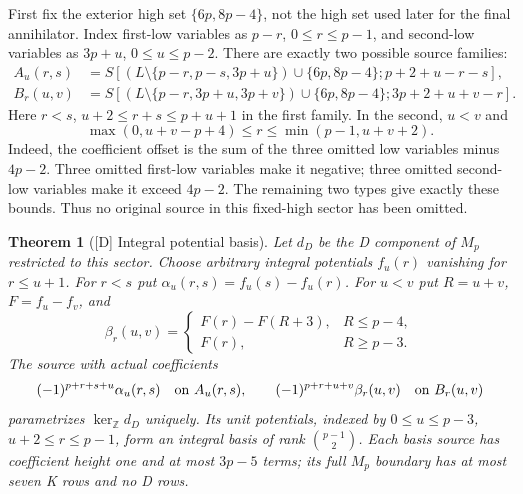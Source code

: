 \documentclass[11pt]{article}
\newtheorem{theorem}{Theorem}[section]
\theoremstyle{definition}
\theoremstyle{remark}
\newcommand{\Z}{\mathbb Z}
\begin{document}
First fix the exterior high set $\{6p,8p-4\}$, not the high set used
later for the final annihilator. Index first-low variables as $p-r$,
$0\leq r\leq p-1$, and second-low variables as $3p+u$,
$0\leq u\leq p-2$. There are exactly two possible source families:
\begin{align*}
 A_u(r,s)&=S[(L\setminus\{p-r,p-s,3p+u\})\cup\{6p,8p-4\};p+2+u-r-s],\\
 B_r(u,v)&=S[(L\setminus\{p-r,3p+u,3p+v\})\cup\{6p,8p-4\};3p+2+u+v-r].
\end{align*}
Here $r<s$, $u+2\leq r+s\leq p+u+1$ in the first family. In the
second, $u<v$ and
\[
 \max(0,u+v-p+4)\leq r\leq\min(p-1,u+v+2).
\]
Indeed, the coefficient offset is the sum of the three omitted low
variables minus $4p-2$. Three omitted first-low variables make it negative;
three omitted second-low variables make it exceed $4p-2$. The remaining
two types give exactly these bounds. Thus no original source in this
fixed-high sector has been omitted.

\begin{theorem}[{[D]} Integral potential basis]\label{thm:basis}
Let $d_D$ be the D component of $M_p$ restricted to this sector. Choose
arbitrary integral potentials $f_u(r)$ vanishing for $r\leq u+1$.
For $r<s$ put $\alpha_u(r,s)=f_u(s)-f_u(r)$. For $u<v$ put
$R=u+v$, $F=f_u-f_v$, and
\[
 \beta_r(u,v)=
 \begin{cases}F(r)-F(R+3),&R\leq p-4,\\F(r),&R\geq p-3.
 \end{cases}
\]
The source with actual coefficients
\[
 (-1)^{p+r+s+u}\alpha_u(r,s)\quad\hbox{on }A_u(r,s),\qquad
 (-1)^{p+r+u+v}\beta_r(u,v)\quad\hbox{on }B_r(u,v)
\]
parametrizes $\ker_{\Z}d_D$ uniquely. Its unit potentials, indexed by
$0\leq u\leq p-3$, $u+2\leq r\leq p-1$, form an integral basis of
rank $\binom{p-1}{2}$. Each basis source has coefficient height one and
at most $3p-5$ terms; its full $M_p$ boundary has at most seven K rows
and no D rows.
\end{theorem}
\end{document}
